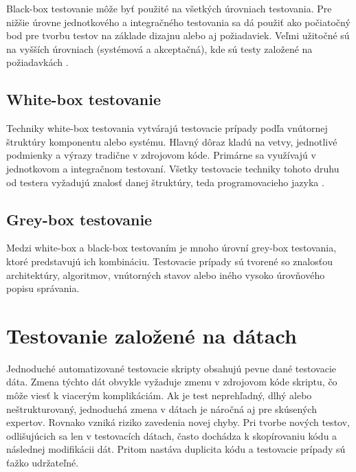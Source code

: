Black-box testovanie môže byť použité na všetkých úrovniach testovania. Pre nižšie úrovne jednotkového a integračného testovania sa dá použiť ako počiatočný bod pre tvorbu testov na základe dizajnu alebo aj požiadaviek. Veľmi užitočné sú na vyšších úrovniach (systémová a akceptačná), kde sú testy založené na požiadavkách  \cite{Gst}.

\subsection*{White-box testovanie}
Techniky white-box testovania vytvárajú testovacie prípady podľa vnútornej štruktúry komponentu alebo systému. Hlavný dôraz kladú na vetvy, jednotlivé podmienky a výrazy tradične v zdrojovom kóde. Primárne sa využívajú v jednotkovom a integračnom testovaní. Všetky testovacie techniky tohoto druhu od testera vyžadujú znalosť danej štruktúry, teda programovacieho jazyka \cite{Gst}.    
\subsection*{Grey-box testovanie}
Medzi white-box a black-box testovaním je mnoho úrovní grey-box testovania, ktoré predstavujú ich kombináciu. Testovacie prípady sú tvorené so znalosťou architektúry, algoritmov, vnútorných stavov alebo iného vysoko úrovňového popisu správania.
\section{Testovanie založené na dátach}
Jednoduché automatizované testovacie skripty obsahujú pevne dané testovacie dáta. Zmena týchto dát obvykle vyžaduje zmenu v zdrojovom kóde skriptu, čo môže viesť k viacerým komplikáciám. Ak je test neprehľadný, dlhý alebo neštrukturovaný, jednoduchá zmena v dátach je náročná aj pre skúsených expertov. Rovnako vzniká riziko zavedenia novej chyby. Pri tvorbe nových testov, odlišujúcich sa len v testovacích dátach, často dochádza k skopírovaniu kódu a následnej modifikácii dát. Pritom nastáva duplicita kódu a testovacie prípady sú ťažko udržateľné. 

